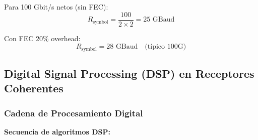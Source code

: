 \documentclass[11pt,a4paper]{article}
\begin{document}
Para 100 Gbit/s netos (sin FEC):
\begin{equation}
    R_{\text{symbol}} = \frac{100}{2 \times 2} = 25 \text{ GBaud}
\end{equation}

Con FEC 20\% overhead:
\begin{equation}
    R_{\text{symbol}} = 28 \text{ GBaud} \quad \text{(típico 100G)}
\end{equation}

\subsection{Digital Signal Processing (DSP) en Receptores Coherentes}

\subsubsection{Cadena de Procesamiento Digital}

\textbf{Secuencia de algoritmos DSP:}
\end{document}
